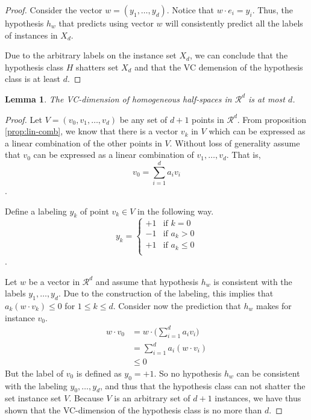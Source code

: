 \documentclass[12pt]{article}
\newtheorem{lemma}{Lemma}[section]
\begin{document}
\begin{enumerate}
\begin{proof}
    Consider the vector $w = (y_1, \dots, y_d)$.
    Notice that $w \cdot e_i = y_i$.
    Thus, the hypothesis $h_w$ that predicts using vector $w$ will consistently predict all the labels of instances in $X_d$.

    Due to the arbitrary labels on the instance set $X_d$, we can conclude that the hypothesis class $H$ shatters set $X_d$ and that the VC demension of the hypothesis class is at least $d$.
\end{proof}

\begin{lemma}
    The VC-dimension of homogeneous half-spaces in $\mathcal{R}^d$ is at most $d$.
\end{lemma}

\begin{proof}
    Let $V=(v_0, v_1, \dots, v_d)$ be any set of $d+1$ points in $\mathcal{R}^d$.
    From proposition \ref{prop:lin-comb}, we know that there is a vector $v_k$ in $V$ which can be expressed as a linear combination of the other points in $V$.
    Without loss of generality assume that $v_0$ can be expressed as a linear combination of $v_1, \dots, v_d$.
    That is,
    \[
    v_0 = \sum_{i=1}^{d} a_i v_i
    \].

    Define a labeling $y_k$ of point $v_k \in V$ in the following way.
    \[
    y_k = \begin{cases}
        +1  &  \text{if } k = 0   \\
        -1  &  \text{if } a_k > 0 \\
        +1  &  \text{if } a_k \leq 0 \\
    \end{cases}
    \].

    Let $w$ be a vector in $\mathcal{R}^d$ and assume that hypothesis $h_w$ is consistent with the labels $y_1, \dots, y_d$.
    Due to the construction of the labeling, this implies that $a_k (w \cdot v_k) \leq 0$ for $1 \leq k \leq d$.
    Consider now the prediction that $h_w$ makes for instance $v_0$.
    \begin{align*}
        w \cdot v_0 &= w \cdot \bigg( \sum_{i=1}^{d} a_i v_i \bigg) \\
            &= \sum_{i=1}^{d} a_i (w \cdot v_i) \\
            &\leq 0
    \end{align*}
    But the label of $v_0$ is defined as $y_0 = +1$.
    So no hypothesis $h_w$ can be consistent with the labeling $y_0, \dots, y_d$, and thus that the hypothesis class can not shatter the set instance set $V$.
    Because $V$ is an arbitrary set of $d+1$ instances, we have thus shown that the VC-dimension of the hypothesis class is no more than $d$.
\end{proof}


\end{enumerate}
\end{document}
